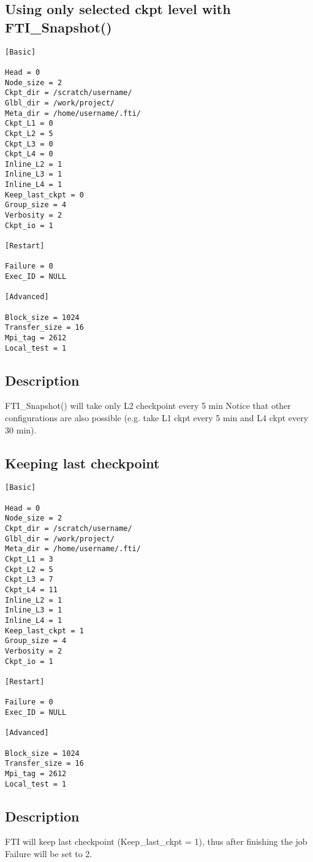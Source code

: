 \documentclass{refrep}
\begin{document}
\subsection{Using only selected ckpt level with FTI\_Snapshot()}\label{subsec:configoneckptlvl}
\begin{center}
\begin{lstlisting}[frame=single]
[Basic]

Head = 0
Node_size = 2
Ckpt_dir = /scratch/username/
Glbl_dir = /work/project/
Meta_dir = /home/username/.fti/
Ckpt_L1 = 0
Ckpt_L2 = 5
Ckpt_L3 = 0
Ckpt_L4 = 0
Inline_L2 = 1
Inline_L3 = 1
Inline_L4 = 1
Keep_last_ckpt = 0
Group_size = 4
Verbosity = 2
Ckpt_io = 1

[Restart]

Failure = 0
Exec_ID = NULL

[Advanced]

Block_size = 1024
Transfer_size = 16
Mpi_tag = 2612
Local_test = 1

\end{lstlisting}
\end{center}
\subsection*{Description}
FTI\_Snapshot() will take only L2 checkpoint every 5 min Notice that other configurations are also possible (e.g. take L1 ckpt every 5 min and L4 ckpt every 30 min).
\newpage
\subsection{Keeping last checkpoint}\label{subsec:configkeeplastckpt}
\begin{center}
\begin{lstlisting}[frame=single]
[Basic]

Head = 0
Node_size = 2
Ckpt_dir = /scratch/username/
Glbl_dir = /work/project/
Meta_dir = /home/username/.fti/
Ckpt_L1 = 3
Ckpt_L2 = 5
Ckpt_L3 = 7
Ckpt_L4 = 11
Inline_L2 = 1
Inline_L3 = 1
Inline_L4 = 1
Keep_last_ckpt = 1
Group_size = 4
Verbosity = 2
Ckpt_io = 1

[Restart]

Failure = 0
Exec_ID = NULL

[Advanced]

Block_size = 1024
Transfer_size = 16
Mpi_tag = 2612
Local_test = 1

\end{lstlisting}
\end{center}
\subsection*{Description}
FTI will keep last checkpoint (Keep\_last\_ckpt = 1), thus after finishing the job Failure will be set to 2.
\newpage
\end{document}
